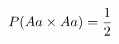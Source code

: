 \documentclass[preview]{standalone}
\begin{document}
\begin{align*}
\special{dvisvgm:raw <g id='unique000'>}P(Aa \times Aa) = \frac{1}{2}\special{dvisvgm:raw </g>}
\end{align*}
\end{document}
